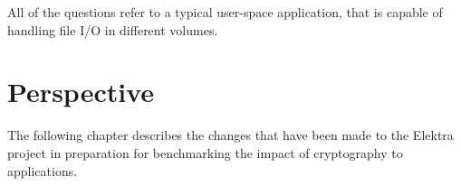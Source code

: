 All of the questions refer to a typical user-space application, that is capable of handling file I/O in different volumes.

\section{Perspective}

The following chapter describes the changes that have been made to the Elektra project in preparation for benchmarking the impact of cryptography to applications.


